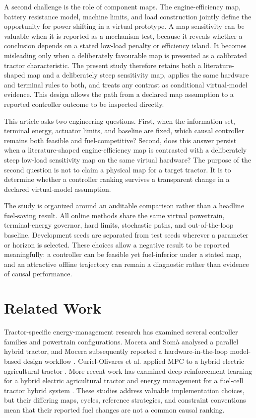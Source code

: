 \documentclass[agriengineering,article,submit,moreauthors]{Definitions/mdpi}
\begin{document}
A second challenge is the role of component maps. The engine-efficiency map, battery resistance model, machine limits, and load construction jointly define the opportunity for power shifting in a virtual prototype. A map sensitivity can be valuable when it is reported as a mechanism test, because it reveals whether a conclusion depends on a stated low-load penalty or efficiency island. It becomes misleading only when a deliberately favourable map is presented as a calibrated tractor characteristic. The present study therefore retains both a literature-shaped map and a deliberately steep sensitivity map, applies the same hardware and terminal rules to both, and treats any contrast as conditional virtual-model evidence. This design allows the path from a declared map assumption to a reported controller outcome to be inspected directly.

This article asks two engineering questions. First, when the information set, terminal energy, actuator limits, and baseline are fixed, which causal controller remains both feasible and fuel-competitive? Second, does this answer persist when a literature-shaped engine-efficiency map is contrasted with a deliberately steep low-load sensitivity map on the same virtual hardware? The purpose of the second question is not to claim a physical map for a target tractor. It is to determine whether a controller ranking survives a transparent change in a declared virtual-model assumption.

The study is organized around an auditable comparison rather than a headline fuel-saving result. All online methods share the same virtual powertrain, terminal-energy governor, hard limits, stochastic paths, and out-of-the-loop baseline. Development seeds are separated from test seeds wherever a parameter or horizon is selected. These choices allow a negative result to be reported meaningfully: a controller can be feasible yet fuel-inferior under a stated map, and an attractive offline trajectory can remain a diagnostic rather than evidence of causal performance.

\section{Related Work}
Tractor-specific energy-management research has examined several controller families and powertrain configurations. Mocera and Som\`a analysed a parallel hybrid tractor, and Mocera subsequently reported a hardware-in-the-loop model-based design workflow \cite{mocera2020,mocera2020b}. Curiel-Olivares et al. applied MPC to a hybrid electric agricultural tractor \cite{curiel2023}. More recent work has examined deep reinforcement learning for a hybrid electric agricultural tractor \cite{wu2024} and energy management for a fuel-cell tractor hybrid system \cite{zhao2024}. These studies address valuable implementation choices, but their differing maps, cycles, reference strategies, and constraint conventions mean that their reported fuel changes are not a common causal ranking.
\end{document}
